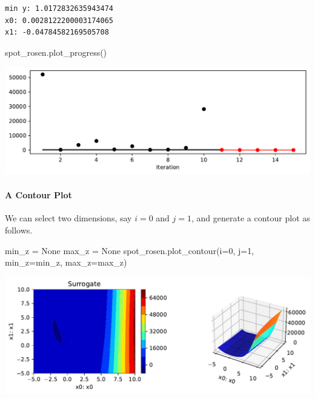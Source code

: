 \documentclass[
  letterpaper,
  DIV=11,
  numbers=noendperiod]{scrreprt}
\let\oldparagraph\paragraph
\renewcommand{\paragraph}[1]{\oldparagraph{#1}\mbox{}}
\newenvironment{Shaded}{\begin{snugshade}}{\end{snugshade}}
\newcommand{\DecValTok}[1]{\textcolor[rgb]{0.68,0.00,0.00}{#1}}
\newcommand{\NormalTok}[1]{\textcolor[rgb]{0.00,0.23,0.31}{#1}}
\newcommand{\OperatorTok}[1]{\textcolor[rgb]{0.37,0.37,0.37}{#1}}
\newcommand{\VariableTok}[1]{\textcolor[rgb]{0.07,0.07,0.07}{#1}}
\begin{document}
\begin{verbatim}
min y: 1.0172832635943474
x0: 0.0028122200003174065
x1: -0.04784582169505708
\end{verbatim}

\begin{Shaded}
\begin{Highlighting}[]
\NormalTok{spot\_rosen.plot\_progress()}
\end{Highlighting}
\end{Shaded}

\includegraphics{009_num_spot_anisotropic_files/figure-pdf/cell-25-output-1.pdf}

\paragraph{A Contour Plot}\label{a-contour-plot-3}

We can select two dimensions, say \(i=0\) and \(j=1\), and generate a
contour plot as follows.

\begin{Shaded}
\begin{Highlighting}[]
\NormalTok{min\_z }\OperatorTok{=} \VariableTok{None}
\NormalTok{max\_z }\OperatorTok{=} \VariableTok{None}
\NormalTok{spot\_rosen.plot\_contour(i}\OperatorTok{=}\DecValTok{0}\NormalTok{, j}\OperatorTok{=}\DecValTok{1}\NormalTok{, min\_z}\OperatorTok{=}\NormalTok{min\_z, max\_z}\OperatorTok{=}\NormalTok{max\_z)}
\end{Highlighting}
\end{Shaded}

\includegraphics{009_num_spot_anisotropic_files/figure-pdf/cell-26-output-1.pdf}
\end{document}
